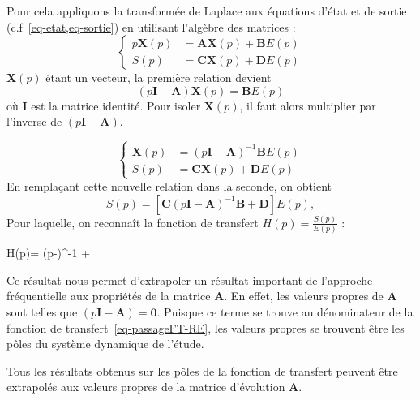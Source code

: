 Pour cela appliquons la transformée de Laplace aux équations d'état et de 
sortie (c.f~\cref{eq-etat,eq-sortie}) en utilisant l'algèbre des matrices :
\[
    \begin{cases}
        p\boldsymbol{X}(p)&=\boldsymbol{AX}(p)+\boldsymbol{B}E(p) \\
        S(p) &= \boldsymbol{CX}(p)+\boldsymbol{D}E(p)
    \end{cases}
\]
$\boldsymbol{X}(p)$ étant un vecteur, la première relation devient 
\[
    (p\boldsymbol{I}-\boldsymbol{A})\boldsymbol{X}(p)=\boldsymbol{B}E(p)
\]
où $\boldsymbol{I}$ est la matrice identité. Pour isoler $\boldsymbol{X}(p)$, 
il faut alors multiplier par l'inverse de $(p\boldsymbol{I}-\boldsymbol{A})$.

\[
\begin{cases}
\boldsymbol{X}(p)&=(p\boldsymbol{I}-\boldsymbol{A})^{-1}\boldsymbol{B}E(p) \\
 S(p)&=\boldsymbol{CX}(p)+\boldsymbol{D}E(p)
\end{cases}
\]
En remplaçant cette nouvelle relation dans la seconde, on obtient 
\[
    S(p)=\left[\boldsymbol{C}(p\boldsymbol{I}-\boldsymbol{A})^{-1}
         \boldsymbol{B}+\boldsymbol{D}\right]E(p),
\]
Pour laquelle, on reconnaît la fonction de transfert $H(p)=\frac{S(p)}{E(p)}$ :
\begin{bequation}
    H(p)=
          \left(p-\right)^{-1}
          +
          \label{eq-passageFT-RE}
\end{bequation}
Ce résultat nous permet d'extrapoler un résultat important de l'approche 
fréquentielle aux propriétés de la matrice $\boldsymbol{A}$. En effet, les
valeurs propres de $\boldsymbol{A}$ sont telles que 
$\left(p\boldsymbol{I}-\boldsymbol{A}\right)=\boldsymbol{0}$. Puisque ce terme 
se trouve au dénominateur de la fonction de transfert~\cref{eq-passageFT-RE},
les valeurs propres se trouvent être les pôles du système dynamique de l'étude.

Tous les résultats obtenus sur les pôles de la fonction de transfert peuvent
être extrapolés aux valeurs propres de la matrice d'évolution $\boldsymbol{A}$.

\captionsetup{width=0.9\linewidth}
